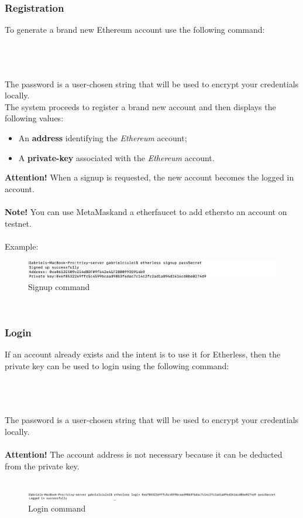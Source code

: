 \subsubsection{Registration}
To generate a brand new Ethereum account use the following command:\\\\
\centerline{}\\\\
The password is a user-chosen string that will be used to encrypt your credentials locally.\\
The system proceeds to register a brand new account and then displays the following values:
\begin{itemize}
	\item An \textbf{address} identifying the \textit{Ethereum\glos} account;
	\item A \textbf{private-key\glos} associated with the \textit{Ethereum\glos} account.
\end{itemize}
\textbf{Attention!} When a signup is requested, the new account becomes the logged in account.\\\\
\textbf{Note!} You can use MetaMask\glo and a ether\glo faucet to add ethers\glo to an account on testnet.\\\\
Example:
	\begin{figure}[h]
		\centering
		\includegraphics[width=\textwidth]{res/img/signup.png}
		\caption{Signup command}
	\end{figure}\\
\subsubsection{Login}
If an account already exists and the intent is to use it for Etherless, then the private key can be used to login using the following command:\\\\
\centerline{}\\\\
The password is a user-chosen string that will be used to encrypt your credentials locally.\\\\
\textbf{Attention!} The account address is not necessary because it can be deducted from the private key.\\\\
\begin{figure}[h]
	\begin{center}
	\includegraphics[width=\textwidth]{res/img/login.png}
	\caption{Login command}
	\end{center}
\end{figure}
